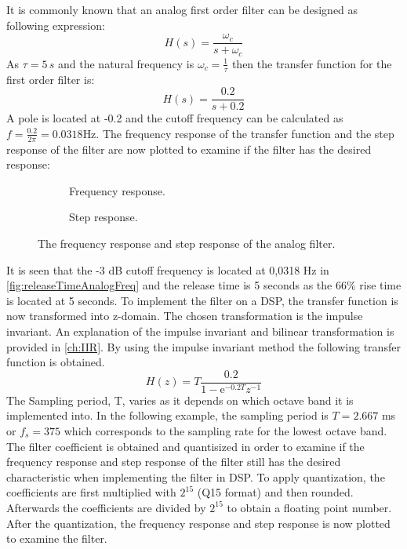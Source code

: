 It is commonly known that an analog first order filter can be designed as following expression:
\begin{equation}
H(s) = \frac{\omega_c}{s+\omega_c}
\end{equation}
As $\tau = 5\, s$ and the natural frequency is $\omega_c = \frac{1}{\tau}$ then the transfer function for the first order filter is:
\begin{equation}
H(s) = \frac{0.2}{s+0.2}
\end{equation} 
A pole is located at -0.2 and the cutoff frequency can be calculated as $f = \frac{0.2}{2\pi} = 0.0318 \text{Hz}$. The frequency response of the transfer function and the step response of the filter are now plotted to examine if the filter has the desired response:

\begin{figure}[H]
\centering
\begin{subfigure}[t]{0.7\textwidth}
	
	\caption{Frequency response.}
	\label{fig:releaseTimeAnalogFreq}
\end{subfigure}
\begin{subfigure}[t]{0.7\textwidth}
	
	\caption{Step response.}
	\label{fig:releaseTimeAnalogStep}
\end{subfigure}
\caption{The frequency response and step response of the analog filter.}
\label{fig:releaseTimeAnalog}
\end{figure}

It is seen that the -3 dB cutoff frequency is located at 0,0318 Hz in \autoref{fig:releaseTimeAnalogFreq} and the release time is 5 seconds as the 66\% rise time is located at 5 seconds. To implement the filter on a DSP, the transfer function is now transformed into z-domain. The chosen transformation is the impulse invariant. An explanation of the impulse invariant and bilinear transformation is provided in \autoref{ch:IIR}. By using the impulse invariant method the following transfer function is obtained.
\begin{equation} \label{eq:releaseTF}
H(z) = T\frac{0.2}{1-\text{e}^{-0.2T} z^{-1}}
\end{equation} 
The Sampling period, T, varies as it depends on which octave band it is implemented into. In the following example, the sampling period is $T = 2.667$ ms or $f_s = 375$ which corresponds to the sampling rate for the lowest octave band. The filter coefficient is obtained and quantisized in order to examine if the frequency response and step response of the filter still has the desired characteristic when implementing the filter in DSP. To apply quantization, the coefficients are first multiplied with $2^{15}$ (Q15 format) and then rounded. Afterwards the coefficients are divided by $2^{15}$ to obtain a floating point number. After the quantization, the frequency response and step response is now plotted to examine the filter.

